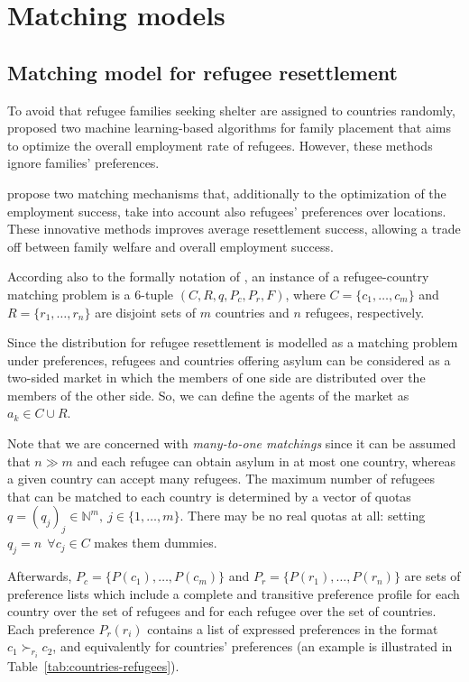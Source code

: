 \section{Matching models}\label{matching-models}%


\subsection{Matching model for refugee resettlement}\label{matching-model-for-refugee-resettlement}%

To avoid that refugee families seeking shelter are assigned to countries randomly,  \citet{basshuysen,bansak} proposed two machine learning-based algorithms for family placement that aims to optimize the overall employment rate of refugees. However, these methods ignore families’ preferences.

\citet{olbergml,fernandez} propose two matching mechanisms that, additionally to the optimization of the employment success, take into account also refugees’ preferences over locations. These innovative methods improves average resettlement success, allowing a trade off between family welfare and overall employment success.

According also to the formally notation of \citet{salles}, an instance of a refugee-country matching problem is a 6-tuple \((C, R, q, P_c, P_r, F)\), where \(C = \{c_1, \dots, c_m\}\) and \(R = \{r_1, \dots, r_n\}\) are disjoint sets of \(m\) countries and \(n\) refugees, respectively.

Since the distribution for refugee resettlement is modelled as a matching problem under preferences, refugees and countries offering asylum can be considered as a two-sided market in which the members of one side are distributed over the members of the other side. So, we can define the agents of the market as \(a_k \in C \cup R\).

Note that we are concerned with \textit{many-to-one matchings} since it can be assumed that \(n \gg m\) and each refugee can obtain asylum in at most one country, whereas a given country can accept many refugees. The maximum number of refugees that can be matched to each country is determined by a vector of quotas \(q = (q_j)_j \in \mathbb{N}^m,\ j \in \{1, \dots, m\}\). There may be no real quotas at all: setting \(q_j = n\ \ \forall c_j \in C\) makes them dummies.

Afterwards, \(P_c = \{P(c_1), \dots, P(c_m)\}\) and \(P_r =\{P(r_1), \dots, P(r_n)\}\) are sets of preference lists which include a complete and transitive preference profile for each country over the set of refugees and for each refugee over the set of countries. Each preference \(P_r(r_i)\) contains a list of expressed preferences in the format \(c_1 \succ_{r_i} c_2\), and equivalently for countries' preferences (an example is illustrated in Table~\ref{tab:countries-refugees}).

